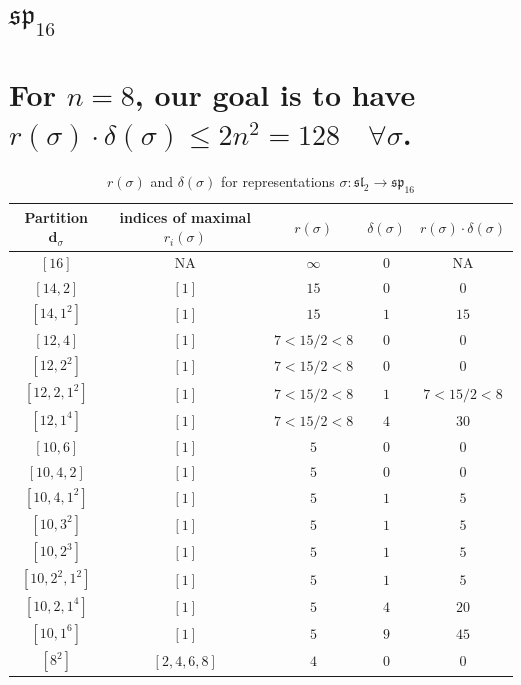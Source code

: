 \documentclass{article}%
\begin{document}
%
\section{$\mathfrak{sp}_{16}$}%
\section*{For $n=8$, our goal is to have $r(\sigma) \cdot \delta(\sigma) \leq 2n^2 = 128 \quad \forall \sigma$.}%

%
\linebreak%

    \begin{center}
    \label{table:sp_16}
    \begin{longtable}{||c|c|c|c|c||}
    \caption{$r(\sigma)$ and $\delta(\sigma)$ for representations $\sigma: \mathfrak{sl}_2 \to \mathfrak{sp}_{16}$}
    \hline
    Partition $\textbf{d}_\sigma$
    &indices of maximal $r_i(\sigma)$
    &$r(\sigma)$
    &$\delta(\sigma)$
    &$r(\sigma) \cdot \delta(\sigma)$
    \\ [0.3ex] \hline\endhead
    $[16]$ & NA & $\infty$ & $0$ & NA \\ \hline 
$[14, 2]$ & $[1]$ & $15$ & $0$ & $0$ \\ \hline 
$[14, 1^{2}]$ & $[1]$ & $15$ & $1$ & $15$ \\ \hline 
$[12, 4]$ & $[1]$ & $7 < 15/2 < 8$ & $0$ & $0$ \\ \hline 
$[12, 2^{2}]$ & $[1]$ & $7 < 15/2 < 8$ & $0$ & $0$ \\ \hline 
$[12, 2, 1^{2}]$ & $[1]$ & $7 < 15/2 < 8$ & $1$ & $7 < 15/2 < 8$ \\ \hline 
$[12, 1^{4}]$ & $[1]$ & $7 < 15/2 < 8$ & $4$ & $30$ \\ \hline 
$[10, 6]$ & $[1]$ & $5$ & $0$ & $0$ \\ \hline 
$[10, 4, 2]$ & $[1]$ & $5$ & $0$ & $0$ \\ \hline 
$[10, 4, 1^{2}]$ & $[1]$ & $5$ & $1$ & $5$ \\ \hline 
$[10, 3^{2}]$ & $[1]$ & $5$ & $1$ & $5$ \\ \hline 
$[10, 2^{3}]$ & $[1]$ & $5$ & $1$ & $5$ \\ \hline 
$[10, 2^{2}, 1^{2}]$ & $[1]$ & $5$ & $1$ & $5$ \\ \hline 
$[10, 2, 1^{4}]$ & $[1]$ & $5$ & $4$ & $20$ \\ \hline 
$[10, 1^{6}]$ & $[1]$ & $5$ & $9$ & $45$ \\ \hline 
$[8^{2}]$ & $[2, 4, 6, 8]$ & $4$ & $0$ & $0$ \\ \hline 

\end{longtable}
\end{center}
\end{document}
